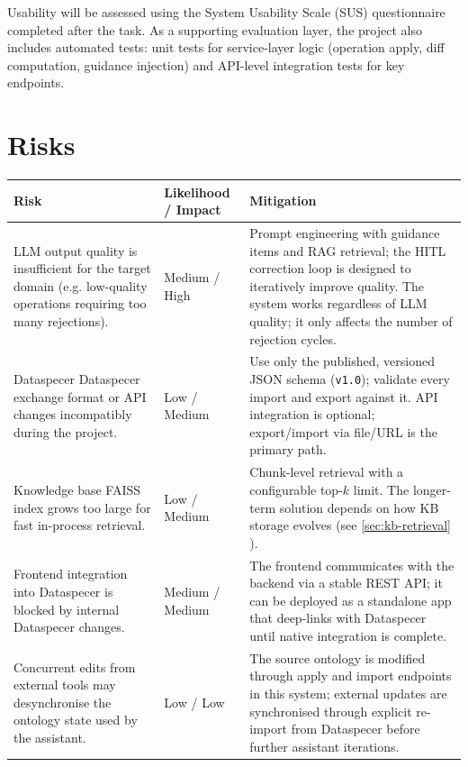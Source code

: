 \documentclass{article}
\newcommand*{\fullref}[1]{\hyperref[{#1}]{\ref*{#1} \nameref*{#1}}}
\begin{document}
Usability will be assessed using the System Usability Scale (SUS) questionnaire completed after the task. As a supporting evaluation layer, the project also includes automated tests: unit tests for service-layer logic (operation apply, diff computation, guidance injection) and API-level integration tests for key endpoints.

\section{Risks}

\begin{longtable}{| p{5cm} | p{5cm} | p{5cm} |}
\hline
\textbf{Risk} & \textbf{Likelihood / Impact} & \textbf{Mitigation} \\
\hline
LLM output quality is insufficient for the target domain (e.g. low-quality operations requiring too many rejections). & Medium / High & Prompt engineering with guidance items and RAG retrieval; the HITL correction loop is designed to iteratively improve quality. The system works regardless of LLM quality; it only affects the number of rejection cycles. \\
\hline
Dataspecer Dataspecer exchange format or API changes incompatibly during the project. & Low / Medium & Use only the published, versioned JSON schema (\texttt{v1.0}); validate every import and export against it. API integration is optional; export/import via file/URL is the primary path. \\
\hline
Knowledge base FAISS index grows too large for fast in-process retrieval. & Low / Medium & Chunk-level retrieval with a configurable top-$k$ limit. The longer-term solution depends on how KB storage evolves (see \fullref{sec:kb-retrieval}). \\
\hline
Frontend integration into Dataspecer is blocked by internal Dataspecer changes. & Medium / Medium & The frontend communicates with the backend via a stable REST API; it can be deployed as a standalone app that deep-links with Dataspecer until native integration is complete. \\
\hline
Concurrent edits from external tools may desynchronise the ontology state used by the assistant. & Low / Low & The source ontology is modified through apply and import endpoints in this system; external updates are synchronised through explicit re-import from Dataspecer before further assistant iterations. \\
\hline
\end{longtable}
\end{document}
